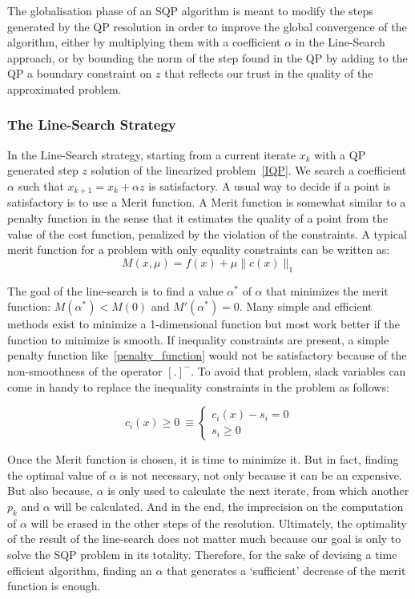 The globalisation phase of an SQP algorithm is meant to modify the steps generated by the QP resolution in order to improve the global convergence of the algorithm, either by multiplying them with a coefficient $\alpha$ in the Line-Search approach, or by bounding the norm of the step found in the QP by adding to the QP a boundary constraint on $z$ that reflects our trust in the quality of the approximated problem.

\subsubsection{The Line-Search Strategy}
\label{ssub:line_search}
In the Line-Search strategy, starting from a current iterate $x_k$ with a QP generated step $z$ solution of the linearized problem~\ref{IQP}.
We search a coefficient $\alpha$ such that $x_{k+1}=x_k+\alpha z$ is satisfactory.
A usual way to decide if a point is satisfactory is to use a Merit function.
A Merit function is somewhat similar to a penalty function in the sense that it estimates the quality of a point from the value of the cost function, penalized by the violation of the constraints.
A typical merit function for a problem with only equality constraints can be written as:
\begin{equation}
  M(x,\mu) = f(x)+\mu \|c(x)\|_1
\end{equation}

The goal of the line-search is to find a value $\alpha^*$ of $\alpha$ that minimizes the merit function: $M(\alpha^*) < M(0)$ and $M'(\alpha^*)=0$.
Many simple and efficient methods exist to minimize a 1-dimensional function but most work better if the function to minimize is smooth.
If inequality constraints are present, a simple penalty function like~\ref{penalty_function} would not be satisfactory because of the non-smoothness of the operator ${[.]}^-$.
To avoid that problem, slack variables can come in handy to replace the inequality constraints in the problem as follows:

\begin{equation}
  c_i(x)\geq 0\ \equiv
  \left\{
  \begin{array}{l}
    c_i(x)-s_i=0\\
    s_i\geq 0
  \end{array}
  \right.
\end{equation}

Once the Merit function is chosen, it is time to minimize it.
But in fact, finding the optimal value of $\alpha$ is not necessary, not only because it can be an expensive.
But also because, $\alpha$ is only used to calculate the next iterate, from which another $p_k$ and $\alpha$ will be calculated.
And in the end, the imprecision on the computation of $\alpha$ will be erased in the other steps of the resolution.
Ultimately, the optimality of the result of the line-search does not matter much because our goal is only to solve the SQP problem in its totality.
Therefore, for the sake of devising a time efficient algorithm, finding an $\alpha$ that generates a `sufficient' decrease of the merit function is enough.

